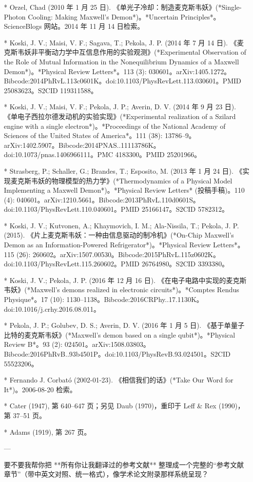 \begin{enumerate}
* Orzel, Chad (2010 年 1 月 25 日). 《单光子冷却：制造麦克斯韦妖》(*Single-Photon Cooling: Making Maxwell's Demon*)。*Uncertain Principles*。ScienceBlogs 网站。2014 年 11 月 14 日检索。

* Koski, J. V.; Maisi, V. F.; Sagava, T.; Pekola, J. P. (2014 年 7 月 14 日). 《麦克斯韦妖非平衡动力学中互信息作用的实验观测》(*Experimental Observation of the Role of Mutual Information in the Nonequilibrium Dynamics of a Maxwell Demon*)。*Physical Review Letters*。113 (3): 030601。arXiv:1405.1272。Bibcode:2014PhRvL.113c0601K。doi:10.1103/PhysRevLett.113.030601。PMID 25083623。S2CID 119311588。

* Koski, J. V.; Maisi, V. F.; Pekola, J. P.; Averin, D. V. (2014 年 9 月 23 日). 《单电子西拉尔德发动机的实验实现》(*Experimental realization of a Szilard engine with a single electron*)。*Proceedings of the National Academy of Sciences of the United States of America*。111 (38): 13786–9。arXiv:1402.5907。Bibcode:2014PNAS..11113786K。doi:10.1073/pnas.1406966111。PMC 4183300。PMID 25201966。

* Strasberg, P.; Schaller, G.; Brandes, T.; Esposito, M. (2013 年 1 月 24 日). 《实现麦克斯韦妖的物理模型的热力学》(*Thermodynamics of a Physical Model Implementing a Maxwell Demon*)。*Physical Review Letters* (投稿手稿)。110 (4): 040601。arXiv:1210.5661。Bibcode:2013PhRvL.110d0601S。doi:10.1103/PhysRevLett.110.040601。PMID 25166147。S2CID 5782312。

* Koski, J. V.; Kutvonen, A.; Khaymovich, I. M.; Ala-Nissila, T.; Pekola, J. P. (2015). 《片上麦克斯韦妖：一种由信息驱动的制冷机》(*On-Chip Maxwell's Demon as an Information-Powered Refrigerator*)。*Physical Review Letters*。115 (26): 260602。arXiv:1507.00530。Bibcode:2015PhRvL.115z0602K。doi:10.1103/PhysRevLett.115.260602。PMID 26764980。S2CID 3393380。

* Koski, J. V.; Pekola, J. P. (2016 年 12 月 16 日). 《在电子电路中实现的麦克斯韦妖》(*Maxwell's demons realized in electronic circuits*)。*Comptes Rendus Physique*。17 (10): 1130–1138。Bibcode:2016CRPhy..17.1130K。doi:10.1016/j.crhy.2016.08.011。

* Pekola, J. P.; Golubev, D. S.; Averin, D. V. (2016 年 1 月 5 日). 《基于单量子比特的麦克斯韦妖》(*Maxwell's demon based on a single qubit*)。*Physical Review B*。93 (2): 024501。arXiv:1508.03803。Bibcode:2016PhRvB..93b4501P。doi:10.1103/PhysRevB.93.024501。S2CID 55523206。

* Fernando J. Corbató (2002-01-23). 《相信我们的话》(*Take Our Word for It*)。2006-08-20 检索。

* Cater (1947), 第 640–647 页；另见 Daub (1970)，重印于 Leff & Rex (1990)，第 37–51 页。

* Adams (1919), 第 267 页。

---

要不要我帮你把 **所有你让我翻译过的参考文献** 整理成一个完整的“参考文献章节”（带中英文对照、统一格式），像学术论文附录那样系统呈现？

\end{enumerate}
